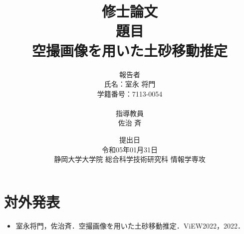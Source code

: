 


  \title{
    修士論文 \\
    \vspace{30pt}
    題目 \\
    空撮画像を用いた土砂移動推定 \\
    \vspace{60pt}
  }
  \author{
    報告者 \\
    氏名：室永 将門 \\
    学籍番号：7113-0054 \\
    \\
    指導教員 \\
    佐治 斉
    \vspace{30pt}
  }
  \date{
    提出日 \\
    令和05年01月31日 \\
    静岡大学大学院 総合科学技術研究科 情報学専攻 \\
  }
  \maketitle

  \setcounter{tocdepth}{3}
  \tableofcontents

  
  
  
  

  \chapter*{対外発表}

    \begin{itemize}
      \item 室永将門，佐治斉．空撮画像を用いた土砂移動推定．ViEW2022，2022．
    \end{itemize}

  \clearpage

  \renewcommand{\bibname}{参考文献}
    
    

